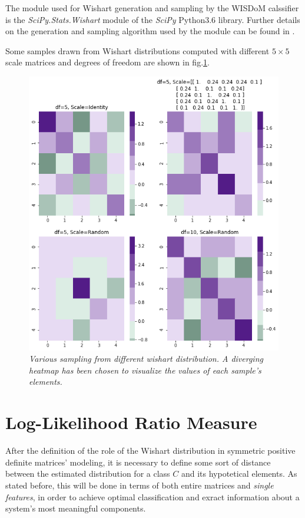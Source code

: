 \documentclass[12pt,openright,twoside,a4paper]{book}
\begin{document}
The module used for Wishart generation and sampling by the WISDoM calssifier is the \textit{SciPy.Stats.Wishart} module of the \textit{SciPy} Python3.6 library.
Further details on the generation and sampling algorithm used  by the module can be found in \cite{WishGen}.

Some  samples drawn from Wishart distributions computed with different  $5 \times 5$ scale matrices and degrees of freedom are shown in fig.\ref{randmatr}.

\clearpage

\begin{figure}[!h]
\centering
\includegraphics[scale=0.5]{randmatr}
\caption{\textit{Various sampling from different wishart distribution. A diverging heatmap has been chosen to visualize the values of each sample's elements.}}
\label{randmatr}
\end{figure}

\section{Log-Likelihood Ratio Measure}

After the definition of the role of the Wishart distribution in symmetric positive definite matrices' modeling, it is necessary to define some sort of distance between the estimated distribution for a class $C$ and its hypotetical elements.
As stated before, this will be done in terms of both entire matrices and \textit{single features}, in order to achieve optimal classification and exract information about a system's most meaningful components.
\end{document}
